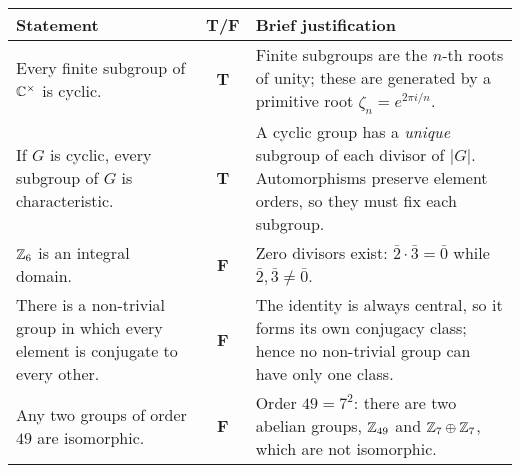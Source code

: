 \documentclass[12pt]{article}
\theoremstyle{definition} %
\theoremstyle{plain} %
\begin{document}
\begin{table}[h]
\small                       %
\setlength{\tabcolsep}{4pt}  %
\renewcommand{\arraystretch}{1.15}

\begin{tabular}{|L{5.7cm}|c|L{7.3cm}|}
\hline
\textbf{Statement} & \textbf{T/F} & \textbf{Brief justification} \\ \hline
Every finite subgroup of $\Bbb C^\times$ is cyclic. &
\textbf{T} &
Finite subgroups are the $n$-th roots of unity; these are generated by a primitive root $\zeta_n=e^{2\pi i/n}$. \\ \hline

If $G$ is cyclic, every subgroup of $G$ is characteristic. &
\textbf{T} &
A cyclic group has a \emph{unique} subgroup of each divisor of $|G|$. Automorphisms preserve element orders, so they must fix each subgroup. \\ \hline

$\Bbb Z_6$ is an integral domain. &
\textbf{F} &
Zero divisors exist: $\bar 2\cdot\bar 3=\bar 0$ while $\bar 2,\bar 3\neq\bar 0$. \\ \hline

There is a non-trivial group in which every element is conjugate to every other. &
\textbf{F} &
The identity is always central, so it forms its own conjugacy class; hence no non-trivial group can have only one class. \\ \hline

Any two groups of order $49$ are isomorphic. &
\textbf{F} &
Order $49=7^{2}$: there are two abelian groups, $\Bbb Z_{49}$ and $\Bbb Z_{7}\oplus\Bbb Z_{7}$, which are not isomorphic. \\ \hline
\end{tabular}
\end{table}
\end{document}
